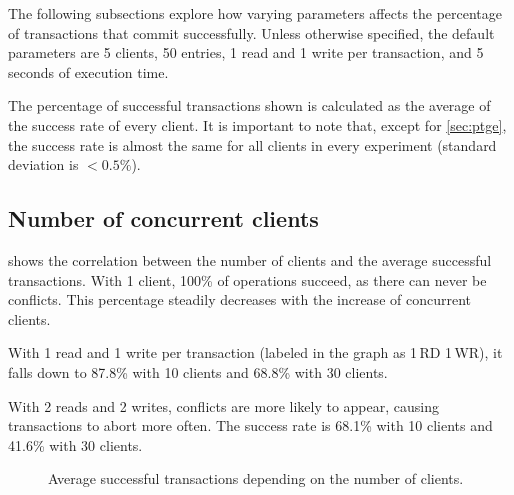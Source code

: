 \documentclass[a4paper, 10pt]{article}
\begin{document}
The following subsections explore how varying parameters affects the percentage of transactions that commit successfully.
Unless otherwise specified, the default parameters are 5 clients, 50 entries, 1 read and 1 write per transaction, and 5 seconds of execution time.

The percentage of successful transactions shown is calculated as the average of the success rate of every client.
It is important to note that, except for \cref{sec:ptge}, the success rate is almost the same for all clients in every experiment (standard deviation is \(< 0.5\%\)).

\subsection{Number of concurrent clients}

 shows the correlation between the number of clients and the average successful transactions.
With 1 client, 100\% of operations succeed, as there can never be conflicts.
This percentage steadily decreases with the increase of concurrent clients.

With 1 read and 1 write per transaction (labeled in the graph as 1\,RD 1\,WR), it falls down to 87.8\% with 10 clients and 68.8\% with 30 clients.

With 2 reads and 2 writes,
conflicts are more likely to appear, causing transactions to abort more often.
The success rate is 68.1\% with 10 clients and 41.6\% with 30 clients.

\begin{figure}[htp]
\begin{center}
\caption{Average successful transactions depending on the  number of clients.}
\label{fig:nclients}
\end{center}
\end{figure}
\end{document}
